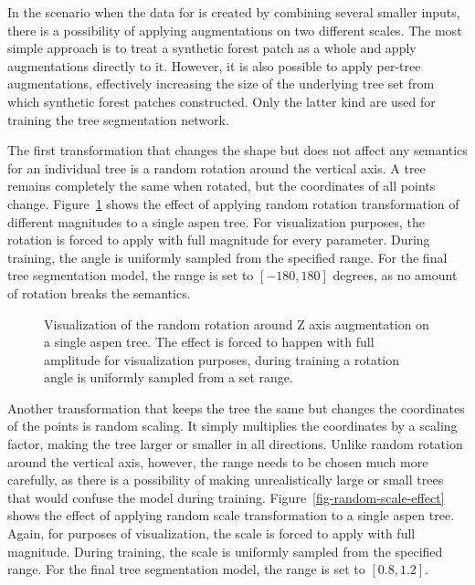 In the scenario when the data for is created by combining several smaller inputs, there is a possibility of applying augmentations on two different scales.
The most simple approach is to treat a synthetic forest patch as a whole and apply augmentations directly to it.
However, it is also possible to apply per-tree augmentations, effectively increasing the size of the underlying tree set from which synthetic forest patches constructed.
Only the latter kind are used for training the tree segmentation network.

The first transformation that changes the shape but does not affect any semantics for an individual tree is a random rotation around the vertical axis.
A tree remains completely the same when rotated, but the coordinates of all points change.
Figure~\ref{fig-random-rotate-effect} shows the effect of applying random rotation transformation of different magnitudes to a single aspen tree.
For visualization purposes, the rotation is forced to apply with full magnitude for every parameter.
During training, the angle is uniformly sampled from the specified range.
For the final tree segmentation model, the range is set to $[-180, 180]$ degrees, as no amount of rotation breaks the semantics.

\begin{figure}
\caption[Visualization of the random rotation around Z axis augmentation on a single aspen tree.]{\label{fig-random-rotate-effect}Visualization of the random
rotation around Z axis augmentation on a single aspen tree. The effect
is forced to happen with full amplitude for visualization purposes,
during training a rotation angle is uniformly sampled from a set range.}
\end{figure}%

Another transformation that keeps the tree the same but changes the coordinates of the points is random scaling.
It simply multiplies the coordinates by a scaling factor, making the tree larger or smaller in all directions.
Unlike random rotation around the vertical axis, however, the range needs to be chosen much more carefully, as there is a possibility of making unrealistically large or small trees that would confuse the model during training.
Figure~\ref{fig-random-scale-effect} shows the effect of applying random scale transformation to a single aspen tree.
Again, for purposes of visualization, the scale is forced to apply with full magnitude.
During training, the scale is uniformly sampled from the specified range.
For the final tree segmentation model, the range is set to $[0.8, 1.2]$.

